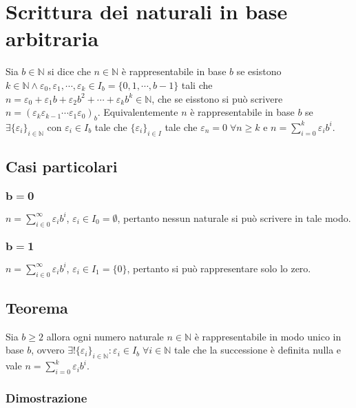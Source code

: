 \chapter{Scrittura dei naturali in base arbitraria}
Sia $b\in\mathbb{N}$ si dice che $n\in\mathbb{N}$ \`e rappresentabile in base $b$ se esistono $k\in\mathbb{N}\wedge\varepsilon_0,\varepsilon_1,\cdots,\varepsilon_k\in I_b=\{0,1,
\cdots, b-1\}$ tali che $n=\varepsilon_0+\varepsilon_1b+\varepsilon_2b^2+\cdots+\varepsilon_kb^k\in\mathbb{N}$, che se eisstono si pu\`o scrivere $n=(\varepsilon_k
\varepsilon_{k-1}\cdots\varepsilon_1\varepsilon_0)_b$. Equivalentemente $n$ \`e rappresentabile in base $b$ se $\exists\{\varepsilon_i\}_{i\in\mathbb{N}}$ con $\varepsilon_i\in 
I_b$ tale che $\{\varepsilon_i\}_{i\in I}$ tale che $\varepsilon_n=0\;\forall n\ge k$ e $n=\sum\limits_{i=0}^k\varepsilon_ib^i$.
\section{Casi particolari}
\subsection{$\mathbf{b=0}$}
$n=\sum\limits_{i\in 0}^\infty\varepsilon_ib^i$, $\varepsilon_i\in I_0=\emptyset$, pertanto nessun naturale si pu\`o scrivere in tale modo.
\subsection{$\mathbf{b=1}$}
$n=\sum\limits_{i\in 0}^\infty\varepsilon_ib^i$, $\varepsilon_i\in I_1=\{0\}$, pertanto si pu\`o rappresentare solo lo zero.
\section{Teorema}
Sia $b\ge 2$ allora ogni numero naturale $n\in\mathbb{N}$ \`e rappresentabile in modo unico in base $b$, ovvero $\exists!\{\varepsilon_i\}_{i\in\mathbb{N}}:\varepsilon_i\in I_b
\;\forall i\in \mathbb{N}$ tale che la successione \`e definita nulla e vale $n=\sum\limits_{i=0}^k\varepsilon_ib^i$. 
\subsection{Dimostrazione}
